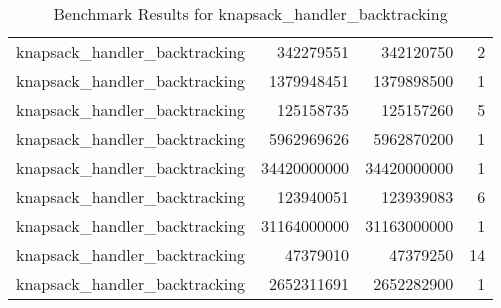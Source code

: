 \documentclass[runningheads]{llncs}
\begin{document}
\begin{table}[h]
\begin{tabular}{@{}lrrr@{}}
        knapsack\_handler\_backtracking & 342279551 & 342120750 & 2 \\
        knapsack\_handler\_backtracking & 1379948451 & 1379898500 & 1 \\
        knapsack\_handler\_backtracking & 125158735 & 125157260 & 5 \\
        knapsack\_handler\_backtracking & 5962969626 & 5962870200 & 1 \\
        knapsack\_handler\_backtracking & 34420000000 & 34420000000 & 1 \\
        knapsack\_handler\_backtracking & 123940051 & 123939083 & 6 \\
        knapsack\_handler\_backtracking & 31164000000 & 31163000000 & 1 \\
        knapsack\_handler\_backtracking & 47379010 & 47379250 & 14 \\
        knapsack\_handler\_backtracking & 2652311691 & 2652282900 & 1 \\
        \bottomrule
    \end{tabular}
    \caption{Benchmark Results for knapsack\_handler\_backtracking}
\end{table}
\clearpage
\end{document}
